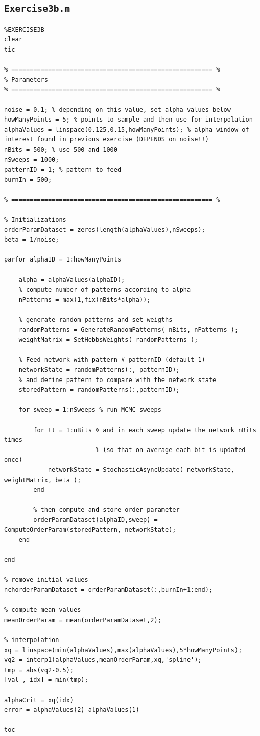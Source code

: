 \documentclass[12pt,A4,titlepage]{article}
\begin{document}
\subsection*{\texttt{Exercise3b.m}}
\begin{lstlisting}
%EXERCISE3B
clear 
tic

% ======================================================= %
% Parameters
% ======================================================= %

noise = 0.1; % depending on this value, set alpha values below
howManyPoints = 5; % points to sample and then use for interpolation
alphaValues = linspace(0.125,0.15,howManyPoints); % alpha window of interest found in previous exercise (DEPENDS on noise!!)
nBits = 500; % use 500 and 1000
nSweeps = 1000;
patternID = 1; % pattern to feed
burnIn = 500;

% ======================================================= %

% Initializations
orderParamDataset = zeros(length(alphaValues),nSweeps);
beta = 1/noise;

parfor alphaID = 1:howManyPoints
    
    alpha = alphaValues(alphaID);
    % compute number of patterns according to alpha
    nPatterns = max(1,fix(nBits*alpha));

    % generate random patterns and set weigths
    randomPatterns = GenerateRandomPatterns( nBits, nPatterns );
    weightMatrix = SetHebbsWeights( randomPatterns );

    % Feed network with pattern # patternID (default 1)
    networkState = randomPatterns(:, patternID);
    % and define pattern to compare with the network state
    storedPattern = randomPatterns(:,patternID); 

    for sweep = 1:nSweeps % run MCMC sweeps

        for tt = 1:nBits % and in each sweep update the network nBits times
                         % (so that on average each bit is updated once)
            networkState = StochasticAsyncUpdate( networkState, weightMatrix, beta );
        end

        % then compute and store order parameter
        orderParamDataset(alphaID,sweep) = ComputeOrderParam(storedPattern, networkState);
    end
    
end

% remove initial values
nchorderParamDataset = orderParamDataset(:,burnIn+1:end);

% compute mean values
meanOrderParam = mean(orderParamDataset,2);

% interpolation
xq = linspace(min(alphaValues),max(alphaValues),5*howManyPoints);
vq2 = interp1(alphaValues,meanOrderParam,xq,'spline');
tmp = abs(vq2-0.5);
[val , idx] = min(tmp);

alphaCrit = xq(idx)
error = alphaValues(2)-alphaValues(1)

toc
\end{lstlisting}
\end{document}
